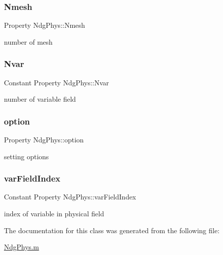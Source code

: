 \subsubsection{\texorpdfstring{Nmesh}{Nmesh}}
{\footnotesize\ttfamily Property Ndg\+Phys\+::\+Nmesh\hspace{0.3cm}{\ttfamily [protected]}}



number of mesh 

\mbox{\label{class_ndg_phys_a5b3f89e37b6c7454274be60f5599c7b7}} 
\subsubsection{\texorpdfstring{Nvar}{Nvar}}
{\footnotesize\ttfamily Constant Property Ndg\+Phys\+::\+Nvar}



number of variable field 

\mbox{\label{class_ndg_phys_af91f4c54b93504e76b38a5693774dff1}} 
\subsubsection{\texorpdfstring{option}{option}}
{\footnotesize\ttfamily Property Ndg\+Phys\+::option\hspace{0.3cm}{\ttfamily [protected]}}



setting options 

\mbox{\label{class_ndg_phys_a9dfbc8c6a9bd2cae056f27bea2403371}} 
\subsubsection{\texorpdfstring{var\+Field\+Index}{varFieldIndex}}
{\footnotesize\ttfamily Constant Property Ndg\+Phys\+::var\+Field\+Index}



index of variable in physical field 



The documentation for this class was generated from the following file\+:\begin{DoxyCompactItemize}
\item 
\hyperlink{_ndg_phys_8m}{Ndg\+Phys.\+m}\end{DoxyCompactItemize}
